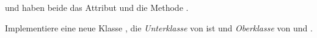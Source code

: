 \documentclass[10pt, a4paper]{arbeitsblatt}
\begin{document}
\begin{enumn}[resume*]
	\item {} und  haben beide das Attribut  und die Methode .

	Implementiere eine neue Klasse , die \emph{Unterklasse} von  ist und \emph{Oberklasse} von  und .
\end{enumn}
\end{document}
